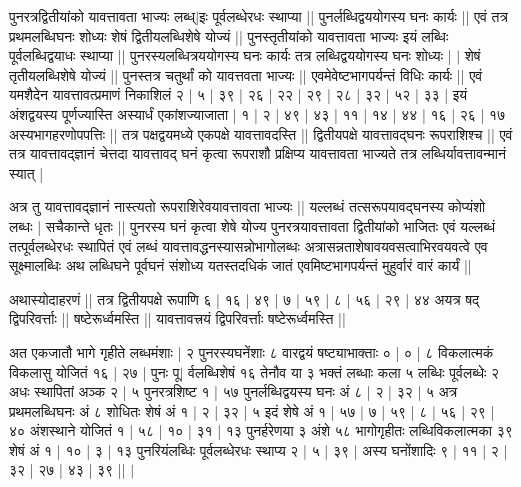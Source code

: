 \documentclass[12pt]{article}
\begin{document}
{पुनरत्रद्वितीयांको यावत्तावता भाज्यः लब्ध्$|$इः पूर्वलब्धेरधः स्थाप्या || पुनर्लब्धिद्वययोगस्य घनः
कार्यः || एवं तत्र प्रथमलब्धिघनः शोध्यः शेषं द्वितीयलब्धि\-शेषे योज्यं || पुनस्तृतीयांको
यावत्तावता भाज्यः इयं लब्धिः पूर्वलब्धिद्वयाधः स्थाप्या || पुनरस्यलब्धित्रययोगस्य घनः कार्यः
तत्र लब्धिद्वययोगस्य घनः शोध्यः | $|$ %
शेषं तृतीयलब्धिशेषे योज्यं || पुनस्तत्र चतुर्थां को यावत्तवता भाज्यः || एवमेवेष्टभागपर्यन्तं विधिः कार्यः ||
एवं यमशैदेन यावत्तावत्प्रमाणं निकाशिलं २ | ५ | ३९ | २६ | २२ | २९ | २८ | ३२ | ५२ | ३३ | इयं
अंशद्वयस्य पूर्णज्यास्ति अस्यार्धं एकांशज्याजाता | १ | २ | ४९ | ४३ | ११ | १४ | ४४ | १६ | २६ | १७
अस्यभागहरणोपपत्तिः ||
तत्र पक्षद्वयमध्ये एकपक्षे यावत्तावदस्ति ||
द्वितीयपक्षे यावत्तावद्घनः रूपराशिश्च ||
एवं तत्र यावत्तावद्ज्ञानं चेत्तदा यावत्तावद् घनं कृत्वा
रूपराशौ प्रक्षिप्य यावत्तावता भाज्यते तत्र लब्धिर्यावत्तावन्मानं स्यात् |

अत्र तु यावत्तावद्ज्ञानं नास्त्यतो रूपराशिरेवयावत्तावता भाज्यः ||
यल्लब्धं तत्सरूपयावद्घनस्य कोप्यंशो लब्धः |
सचैकान्ते धृतः || पुनरस्य घनं कृत्वा शेषे
योज्य पुनरत्रयावत्तावता द्वितीयांको भाजितः एवं यल्लब्धं तत्पूर्वलब्धेरधः स्थापितं एवं लब्धं यावत्तावद्धनस्यासन्नोभागोलब्धः
अत्रासन्नताशेषावयवसत्वाभिरवयवत्वे एव सूक्ष्मालब्धिः अथ लब्धिघने पूर्वघनं
संशोध्य यतस्तदधिकं जातं एवमिष्टभागपर्यन्तं मुहुर्वारं वारं कार्यं ||

अथास्योदाहरणं ||
तत्र द्वितीयपक्षे रूपाणि ६ | १६ | ४९ | ७ | ५९ | ८ | ५६ | २९ | ४४ अयत्र षद्
द्विपरिवर्त्ताः ||
षष्टेरूर्ध्वमस्ति ||
यावत्तावत्त्रयं द्विपरिवर्त्ताः षष्टेरूर्ध्वमस्ति ||

अत एकजातौ भागे गृहीते लब्धमंशाः | २ पुनरस्यघनेंशाः ८ वारद्वयं षष्ट्याभाक्ताः ० |
० | ८ विकलात्मकं विकलासु योजितं १६ | २७ | पुनः पू$|$%
र्वलब्धिशेषं १६
तेनौव या ३ भक्तं लब्धाः कला ५ लब्धिः पूर्वलब्धेः २ अधः स्थापितां अञ्क २ | ५
पुनरत्रशिष्ट १ | ५७ पुनर्लब्धिद्वयस्य घनः अं ८ | २ | ३२ | ५
अत्र प्रथमलब्धिघनः अं ८
शोधितः शेषं अं १ | २ | ३२ | ५ इदं शेषे अं १ | ५७ | ७ | ५९ | ८ | ५६ | २९ | ४० अंशस्थाने योजितं
१ | ५८ | १० | ३१ | १३ पुनर्हरेणया ३ अंशे ५८ भागोगृहीतः लब्धिविकलात्मका ३९ शेषं अं १ | १० | ३ | १३ पुनरियंलब्धिः पूर्वलब्धेरधः स्थाप्य २ | ५ |
३९ | अस्य घनोंशादिः ९ | ११ | २ | ३२ | २७ | ४३ | ३९ || 
$|$ 


}
\end{document}
